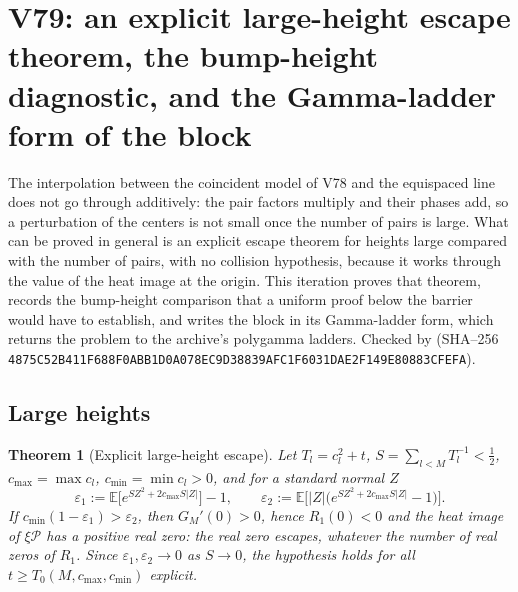 \documentclass[11pt]{article}
\newtheorem{theorem}{Theorem}[section]
\theoremstyle{definition}
\theoremstyle{remark}
\begin{document}




\clearpage
\section{V79: an explicit large-height escape theorem, the bump-height diagnostic, and the Gamma-ladder form of the block}
\label{sec:f2v79-large-t}
\begingroup
\setcounter{equation}{0}
\renewcommand{\theequation}{N79.\arabic{equation}}
\renewcommand{\theHequation}{f2v79.\arabic{equation}}

The interpolation between the coincident model of V78 and the equispaced
line does not go through additively: the pair factors multiply and their
phases add, so a perturbation of the centers is not small once the
number of pairs is large.  What can be proved in general is an explicit
escape theorem for heights large compared with the number of pairs, with
no collision hypothesis, because it works through the value of the heat
image at the origin.  This iteration proves that theorem, records the
bump-height comparison that a uniform proof below the barrier would
have to establish, and writes the block in its Gamma-ladder form, which
returns the problem to the archive's polygamma ladders.  Checked by
 (SHA--256
\texttt{4875C52B411F688F0ABB1D0A078EC9D3}\allowbreak\texttt{8839AFC1F6031DAE2F149E80883CFEFA}).

\subsection{Large heights}

\begin{theorem}[Explicit large-height escape]
\label{thm:f2v79-large-t}
Let \(T_l=c_l^2+t\), \(S=\sum_{l<M}T_l^{-1}<\tfrac12\), \(c_{\max}=\max c_l\),
\(c_{\min}=\min c_l>0\), and for a standard normal \(Z\)
\begin{equation}
 \varepsilon_1:=\mathbb E\bigl[e^{SZ^2+2c_{\max}S|Z|}\bigr]-1,\qquad
 \varepsilon_2:=\mathbb E\bigl[|Z|\bigl(e^{SZ^2+2c_{\max}S|Z|}-1\bigr)\bigr].
 \label{eq:f2v79-eps}
\end{equation}
If \(c_{\min}(1-\varepsilon_1)>\varepsilon_2\), then \(G_M'(0)>0\), hence
\(R_1(0)<0\) and the heat image of \(\xi\mathcal P\) has a positive real
zero: the real zero escapes, whatever the number of real zeros of
\(R_1\).  Since \(\varepsilon_1,\varepsilon_2\to0\) as \(S\to0\), the
hypothesis holds for all \(t\ge T_0(M,c_{\max},c_{\min})\) explicit.
\end{theorem}
\end{document}

